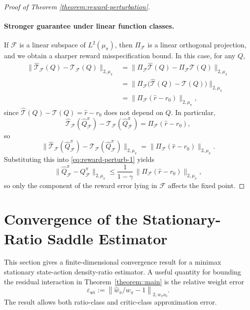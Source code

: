 \documentclass{article}
\theoremstyle{plain}
\theoremstyle{definition}
\theoremstyle{remark}
\begin{document}
\begin{proof}[Proof of Theorem \ref{theorem:reward-perturbation}]
\paragraph{Stronger guarantee under linear function classes.}
If $\mathcal F$ is a linear subspace of $L^2({\mu_\pi})$, then
$\Pi_{\mathcal F}$ is a linear orthogonal projection, and we obtain a sharper
reward misspecification bound. In this case,
for any $Q$,
\begin{align*}
\|\widehat{\mathcal{T}}_{\mathcal F}(Q) - \mathcal{T}_{\mathcal F}(Q)\|_{2,{\mu_\pi}}
&=
\|\Pi_{\mathcal F}\widehat{\mathcal{T}}(Q)
  - \Pi_{\mathcal F}\mathcal{T}(Q)\|_{2,{\mu_\pi}}
\\
&=
\|\Pi_{\mathcal F}\bigl(\widehat{\mathcal{T}}(Q) - \mathcal{T}(Q)\bigr)\|_{2,{\mu_\pi}}
\\
&=
\|\Pi_{\mathcal F}(\widehat r - r_0)\|_{2,{\mu_\pi}},
\end{align*}
since $\widehat{\mathcal{T}}(Q) - \mathcal{T}(Q) = \widehat r - r_0$ does not depend on $Q$.
In particular,
\[
\widehat{\mathcal{T}}_{\mathcal F}(\widehat Q^\pi_{\mathcal F})
  - \mathcal{T}_{\mathcal F}(\widehat Q^\pi_{\mathcal F})
=
\Pi_{\mathcal F}(\widehat r - r_0),
\]
so
\[
\|\widehat{\mathcal{T}}_{\mathcal F}(\widehat Q^\pi_{\mathcal F})
  - \mathcal{T}_{\mathcal F}(\widehat Q^\pi_{\mathcal F})\|_{2,{\mu_\pi}}
=
\|\Pi_{\mathcal F}(\widehat r - r_0)\|_{2,{\mu_\pi}}.
\]
Substituting this into \eqref{eq:reward-perturb-1} yields
\[
\|\widehat Q^\pi_{\mathcal F} - Q^\pi_{\mathcal F}\|_{2,{\mu_\pi}}
\le
\frac{1}{1-\gamma}\,
\|\Pi_{\mathcal F}(\widehat r - r_0)\|_{2,{\mu_\pi}},
\]
so only the component of the reward error lying in $\mathcal F$ affects
the fixed point.

\end{proof}
 \section{Convergence of the Stationary-Ratio Saddle Estimator}
\label{sec:stationary-ratio-minimax-theory}

This section gives a finite-dimensional convergence result for a minimax
stationary state-action density-ratio estimator. A useful quantity for bounding
the residual interaction in Theorem~\ref{theorem::main} is the relative weight
error
\[
\varepsilon_{\mathrm{wt}}
:=
\left\|\widehat w_\pi/w_\pi-1\right\|_{2,w_\pi\nu_b}.
\]
The result allows both ratio-class and critic-class approximation error.
\end{document}
